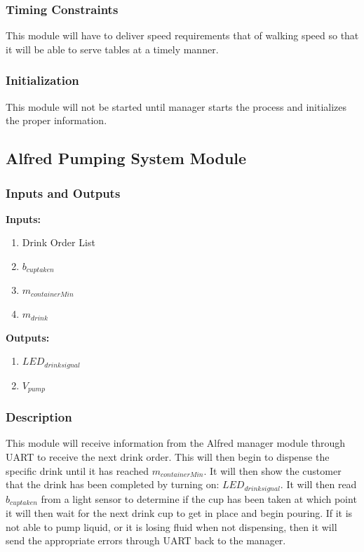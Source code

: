\documentclass [10pt]{article}
\begin{document}
\subsubsection{Timing Constraints}
This module will have to deliver speed requirements that of walking speed so that it will be able to serve tables at a timely manner.

\subsubsection{Initialization}
This module will not be started until manager starts the process and initializes the proper information.

\subsection{Alfred Pumping System Module}

\subsubsection{Inputs and Outputs}

\textbf{Inputs: } 
\begin{enumerate}
	\item Drink Order List
	\item $ b_{cuptaken } $
	\item $ m_{containerMin} $
	\item $ m_{drink} $
\end{enumerate}

\textbf{Outputs: } 
\begin{enumerate}
	\item $ LED_{drinksignal} $
	\item $ V_{pump } $
	
\end{enumerate}

\subsubsection{Description}
This module will receive information from the Alfred manager module through UART to receive the next drink order. This will then begin to dispense the specific drink until it has reached $ m_{containerMin} $. It will then show the customer that the drink has been completed by turning on: $ LED_{drinksignal} $. It will then read $ b_{cuptaken} $ from a light sensor to determine if the cup has been taken at which point it will then wait for the next drink cup to get in place and begin pouring. If it is not able to pump liquid, or it is losing fluid when not dispensing, then it will send the appropriate errors through UART back to the manager.
\end{document}

